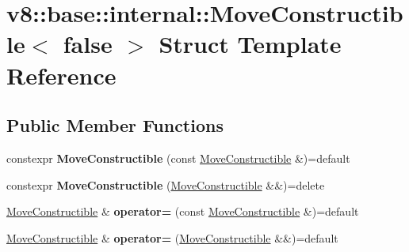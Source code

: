 \hypertarget{structv8_1_1base_1_1internal_1_1MoveConstructible_3_01false_01_4}{}\section{v8\+:\+:base\+:\+:internal\+:\+:Move\+Constructible$<$ false $>$ Struct Template Reference}
\label{structv8_1_1base_1_1internal_1_1MoveConstructible_3_01false_01_4}
\subsection*{Public Member Functions}
\begin{DoxyCompactItemize}
\item 
\mbox{\label{structv8_1_1base_1_1internal_1_1MoveConstructible_3_01false_01_4_a5d08bae5a0a9687b86ec9cb073bf5db3}} 
constexpr {\bfseries Move\+Constructible} (const \mbox{\hyperlink{structv8_1_1base_1_1internal_1_1MoveConstructible}{Move\+Constructible}} \&)=default
\item 
\mbox{\label{structv8_1_1base_1_1internal_1_1MoveConstructible_3_01false_01_4_af85e00b35d9a042cdb74b1b8e0c923f4}} 
constexpr {\bfseries Move\+Constructible} (\mbox{\hyperlink{structv8_1_1base_1_1internal_1_1MoveConstructible}{Move\+Constructible}} \&\&)=delete
\item 
\mbox{\label{structv8_1_1base_1_1internal_1_1MoveConstructible_3_01false_01_4_a36e2f7c1b736a74dd5c02be0e70614cf}} 
\mbox{\hyperlink{structv8_1_1base_1_1internal_1_1MoveConstructible}{Move\+Constructible}} \& {\bfseries operator=} (const \mbox{\hyperlink{structv8_1_1base_1_1internal_1_1MoveConstructible}{Move\+Constructible}} \&)=default
\item 
\mbox{\label{structv8_1_1base_1_1internal_1_1MoveConstructible_3_01false_01_4_a8f16f3d188522a15db81771495dac6aa}} 
\mbox{\hyperlink{structv8_1_1base_1_1internal_1_1MoveConstructible}{Move\+Constructible}} \& {\bfseries operator=} (\mbox{\hyperlink{structv8_1_1base_1_1internal_1_1MoveConstructible}{Move\+Constructible}} \&\&)=default
\end{DoxyCompactItemize}


